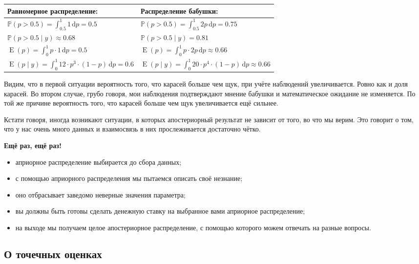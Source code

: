 \documentclass[12pt, a4paper, oneside]{extreport}
\DeclareMathOperator{\E}{\mathop{E}}
\def \mbb{\mathbb}
\def \PP{\mbb{P}}
\newcommand{\dx}[1]{\,\mathrm{d}#1} %
\theoremstyle{plain}              %
\theoremstyle{definition}         %
\begin{document}
\begin{table}[H]
\begin{tabularx}{\textwidth}{@{}XX@{}}
\toprule	
Равномерное распределение: & Распределение бабушки: \\
\midrule
$ \PP( p > 0.5 ) = \int_{0.5}^1 1 \dx{p} = 0.5 $  &   $ \PP( p > 0.5 ) = \int_{0.5}^1 2p \dx{p} = 0.75 $ \\
$\PP( p > 0.5 \mid y) \approx 0.68  $& $\PP( p > 0.5 \mid y) =  0.81 $  \\
$\E(p) = \int_0^1 p \cdot 1 \dx{p} = 0.5 $ & $ \E(p) = \int_0^1 p \cdot 2p \dx{p}  \approx 0.66 $  \\
$\E(p \mid y) = \int_0^1 12 \cdot p^3 \cdot (1-p) \dx{p} = 0.6$ & $\E(p \mid y) = \int_0^1 20  \cdot p^4 \cdot (1-p) \dx{p} \approx 0.66$ \\
\bottomrule
\end{tabularx}
\end{table}


Видим, что в первой ситуации вероятность того, что карасей больше чем щук, при учёте наблюдений увеличивается. Ровно как и доля карасей. Во втором случае, грубо говоря,  мои наблюдения подтверждают мнение бабушки и математическое ожидание не изменяется. По той же причине вероятность того, что карасей больше чем щук увеличивается ещё сильнее. 

Кстати говоря, иногда возникают ситуации, в которых апостериорный результат не зависит от того, во что мы верим. Это говорит о том, что у нас очень много данных и взаимосвязь в них прослеживается достаточно чётко. 

\textbf{Ещё раз, ещё раз!} 

\begin{itemize}
\item  априорное распределение выбирается до сбора данных;
\item  с помощью априорного распределения мы пытаемся описать своё незнание;
\item  оно отбрасывает заведомо неверные значения параметра;
\item  вы должны быть готовы сделать денежную ставку на выбранное вами априорное распределение;
\item  на выходе мы получаем целое апостериорное распределение, с помощью которого можем отвечать на разные вопросы.
\end{itemize}

\subsection*{О точечных оценках} 
\end{document}
